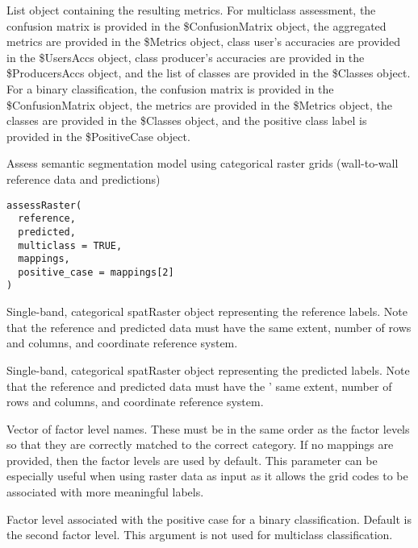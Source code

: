 \documentclass[a4paper]{book}
\begin{document}
%
\begin{Value}
List object containing the resulting metrics. For multiclass assessment,
the confusion matrix is provided in the \$ConfusionMatrix object, the aggregated
metrics are provided in the \$Metrics object, class user's accuracies are provided
in the \$UsersAccs object, class producer's accuracies are provided in the
\$ProducersAccs object, and the list of classes are provided in the \$Classes object.
For a binary classification, the confusion matrix is provided in the
\$ConfusionMatrix object, the metrics are provided in the \$Metrics object,
the classes are provided in the \$Classes object, and the positive class label is
provided in the \$PositiveCase object.
\end{Value}
%
\begin{Description}\relax
Assess semantic segmentation model using categorical raster grids (wall-to-wall
reference data and predictions)
\end{Description}
%
\begin{Usage}
\begin{verbatim}
assessRaster(
  reference,
  predicted,
  multiclass = TRUE,
  mappings,
  positive_case = mappings[2]
)
\end{verbatim}
\end{Usage}
%
\begin{Arguments}
\begin{ldescription}
\item[\code{reference}] Single-band, categorical spatRaster object representing
the reference labels. Note that the reference and predicted data must have
the same extent, number of rows and columns, and coordinate reference system.

\item[\code{predicted}] Single-band, categorical spatRaster object representing the
predicted labels. Note that the reference and predicted data must have the '
same extent, number of rows and columns, and coordinate reference system.

\item[\code{mappings}] Vector of factor level names. These must be in the same order
as the factor levels so that they are correctly matched to the correct category.
If no mappings are provided, then the factor levels are used by default. This
parameter can be especially useful when using raster data as input as it
allows the grid codes to be associated with more meaningful labels.

\item[\code{positive\_case}] Factor level associated with the positive case for a
binary classification. Default is the second factor level. This argument is
not used for multiclass classification.
\end{ldescription}
\end{Arguments}
\end{document}
